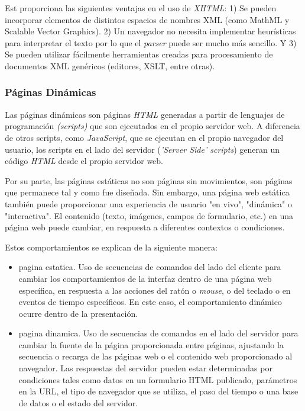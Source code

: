  Est proporciona las siguientes ventajas en el uso de \textit{XHTML}: 1) Se pueden incorporar elementos de distintos espacios de nombres XML (como MathML y Scalable Vector Graphics). 2)  Un navegador no necesita implementar heurísticas para interpretar el texto por lo que el \textit{parser} puede ser mucho más sencillo. Y 3) Se pueden utilizar fácilmente herramientas creadas para procesamiento de documentos XML genéricos (editores, XSLT, entre otras).

\subsubsection{Páginas Dinámicas}  
   

Las páginas dinámicas   son páginas \textit{HTML} generadas a partir de lenguajes de programación \textit{(\gls{scripts})} que son ejecutados en el propio servidor web. A diferencia de otros scripts, como  \textit{JavaScript}, que se ejecutan en el propio navegador del usuario, los scripts en el lado del servidor (\textit{'Server Side' scripts})  generan un código \textit{HTML} desde el propio servidor web. 

Por su parte, las páginas estáticas no son  páginas sin movimientos, son páginas que permanece tal y como fue diseñada. Sin embargo, una página web estática también puede proporcionar una experiencia de usuario "en vivo", "dinámica" o "interactiva". El contenido (texto, imágenes, campos de formulario, etc.) en una página web puede cambiar, en respuesta a diferentes contextos o condiciones.

Estos comportamientos se explican de la siguiente manera:

\begin{itemize}
	\item \gls{pagina estatica}. Uso de secuencias de comandos del lado del cliente para cambiar los comportamientos de la interfaz dentro de una página web específica, en respuesta a las acciones del ratón o \textit{mouse}, o del teclado o en eventos de tiempo específicos. En este caso, el comportamiento dinámico ocurre dentro de la presentación. 
	\item \gls{pagina dinamica}. Uso de secuencias de comandos en el lado del servidor para cambiar la fuente de la página proporcionada entre páginas, ajustando la secuencia o recarga de las páginas web o el contenido web proporcionado al navegador. Las respuestas del servidor pueden estar determinadas por condiciones tales como datos en un formulario HTML publicado, parámetros en la URL, el tipo de navegador que se utiliza, el paso del tiempo o una base de datos o el estado del servidor.
\end{itemize}

